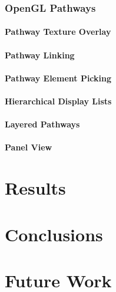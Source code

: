\subsection{OpenGL Pathways}
\subsubsection{Pathway Texture Overlay}
\subsubsection{Pathway Linking}
\subsubsection{Pathway Element Picking}
\subsubsection{Hierarchical Display Lists}
\subsubsection{Layered Pathways}
\subsubsection{Panel View}

\chapter{Results}

\chapter{Conclusions}

\chapter{Future Work}



